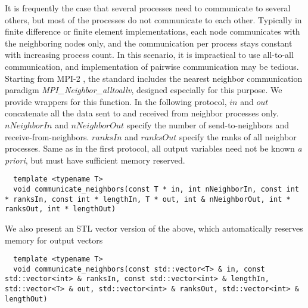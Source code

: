 \noindent
It is frequently the case that several processes need to communicate to several others, but most of the processes do not communicate to each other. Typically in finite difference or finite element implementations, each node communicates with the neighboring nodes only, and the communication per process stays constant with increasing process count. In this scenario, it is impractical to use all-to-all communication, and implementation of pairwise communication may be tedious. Starting from MPI-2 \cite{MPI-3.1}, the standard includes the nearest neighbor communication paradigm \textit{MPI\_Neighbor\_alltoallv}, designed especially for this purpose. We provide wrappers for this function. In the following protocol, $in$ and $out$ concatenate all the data sent to and received from neighbor processes only. $nNeighborIn$ and $nNeighborOut$ specify the number of send-to-neighbors and receive-from-neighbors. $ranksIn$ and $ranksOut$ specify the ranks of all neighbor processes. Same as in the first protocol, all output variables need not be known \textit{a priori}, but must have sufficient memory reserved.
\begin{mybox}
\begin{lstlisting}
  template <typename T>
  void communicate_neighbors(const T * in, int nNeighborIn, const int * ranksIn, const int * lengthIn, T * out, int & nNeighborOut, int * ranksOut, int * lengthOut)
\end{lstlisting}
\end{mybox}
\noindent
We also present an STL vector version of the above, which automatically reserves memory for output vectors
\begin{mybox}
\begin{lstlisting}
  template <typename T>
  void communicate_neighbors(const std::vector<T> & in, const std::vector<int> & ranksIn, const std::vector<int> & lengthIn, std::vector<T> & out, std::vector<int> & ranksOut, std::vector<int> & lengthOut)
\end{lstlisting}
\end{mybox}



